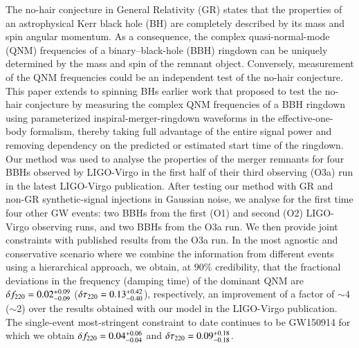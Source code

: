   The no-hair conjecture in General Relativity (GR) states that the
  properties of an astrophysical Kerr black hole (BH) are completely described by its
  mass and spin angular momentum. As a consequence, the complex
  quasi-normal-mode (QNM) frequencies of a binary--black-hole (BBH)
  ringdown can be uniquely determined by the mass and spin of the
  remnant object. Conversely, measurement of the QNM frequencies could
  be an independent test of the no-hair conjecture. This paper extends to spinning BHs earlier work that proposed to
  test the no-hair conjecture by measuring the complex QNM
  frequencies of a BBH ringdown using parameterized inspiral-merger-ringdown waveforms in the effective-one-body formalism, 
thereby taking full advantage of the entire signal power and removing dependency on the
  predicted or estimated start time of the ringdown. Our method was used to analyse the
  properties of the merger remnants for four BBHs observed by
  LIGO-Virgo in the first half of their third observing (O3a) run in
  the latest LIGO-Virgo publication. After testing our method with GR and non-GR synthetic-signal injections in Gaussian noise, 
we analyse for the first time four other GW events: two BBHs from the first (O1) and second (O2) LIGO-Virgo 
  observing runs, and two BBHs from the O3a run. We then provide joint constraints with published results
  from the O3a run. In the most agnostic and conservative scenario where we combine the information from different
events using a hierarchical approach, we obtain, at $90\%$ credibility, that 
the fractional deviations in the frequency (damping time) of the dominant QNM are 
$\delta f_{\text{220}}=0.02^{+0.09}_{-0.09}$ ($\delta \tau_{\text{220}}=0.13^{+0.42}_{-0.40}$), respectively, an improvement of a factor of $\sim 4$ ($\sim 2$) 
over the results obtained with our model in the LIGO-Virgo publication. The single-event most-stringent constraint to date continues to be 
GW150914 for which we obtain $\delta f_{\text{220}}=0.04^{+0.06}_{-0.04}$ and $\delta \tau_{\text{220}}=0.09^{+0.18}_{-0.18}$.